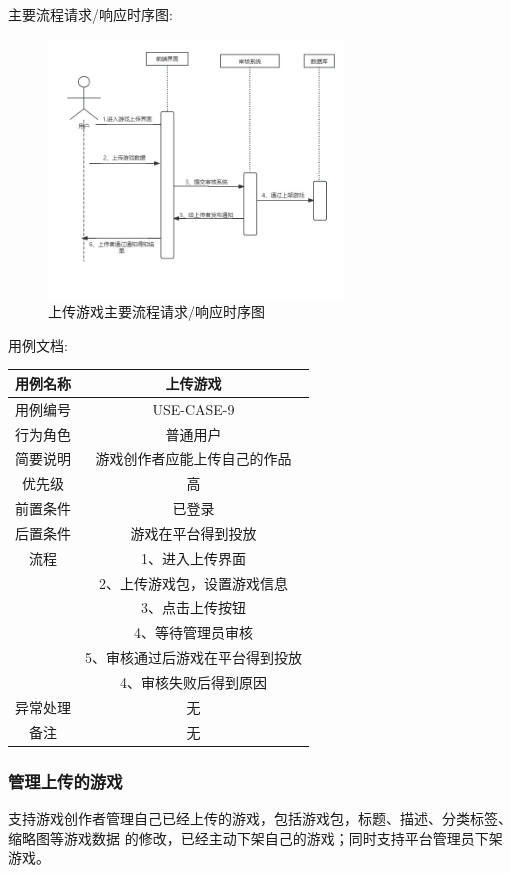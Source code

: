 \documentclass[12pt]{ctexart} %
\begin{document}
主要流程请求/响应时序图:
\begin{figure}[h]
  \centering
  \includegraphics[width=0.7\textwidth]{yongli9.jpg}
  \caption{上传游戏主要流程请求/响应时序图}
\end{figure}
用例文档:

\begin{tabular}{|c|c|}
  \hline
  用例名称& 上传游戏\\
  \hline
  用例编号 & USE-CASE-9\\
  \hline
  行为角色 & 普通用户\\
  \hline
  简要说明 & 游戏创作者应能上传自己的作品\\
  \hline
  优先级 & 高\\
  \hline
  前置条件 & 已登录\\
  \hline
  后置条件 & 游戏在平台得到投放\\
  \hline
  流程 & 1、进入上传界面\\
      &  2、上传游戏包，设置游戏信息\\
      &  3、点击上传按钮\\
      &  4、等待管理员审核\\
      &  5、审核通过后游戏在平台得到投放\\
      &  4、审核失败后得到原因\\
  \hline
  异常处理 & 无\\
  \hline
  备注 & 无\\
  \hline
\end{tabular}

\subsubsection{管理上传的游戏}
支持游戏创作者管理自己已经上传的游戏，包括游戏包，标题、描述、分类标签、缩略图等游戏数据
的修改，已经主动下架自己的游戏；同时支持平台管理员下架游戏。
\end{document}
